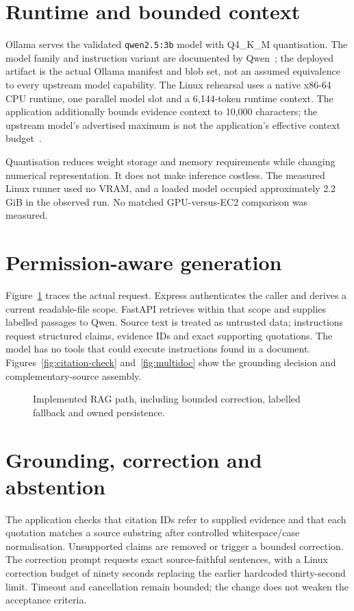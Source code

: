 \documentclass[11pt,a4paper,oneside]{report}
\newcommand{\ShortCaption}[1]{\csname ShortCaption#1\endcsname}
\newcommand{\diagram}[3]{\par\begin{figure}[htbp]\centering\sbox{\DiagramBox}{}\ifdim\wd\DiagramBox>\linewidth\resizebox{\linewidth}{!}{\usebox{\DiagramBox}}\else\usebox{\DiagramBox}\fi\caption[\ShortCaption{#1}]{#2}\label{fig:#3}\end{figure}\par}
\begin{document}
\section{Runtime and bounded context}
Ollama serves the validated \texttt{qwen2.5:3b} model with Q4\_K\_M quantisation. The model family and instruction variant are documented by Qwen~\cite{qwen}; the deployed artifact is the actual Ollama manifest and blob set, not an assumed equivalence to every upstream model capability. The Linux rehearsal uses a native x86-64 CPU runtime, one parallel model slot and a 6,144-token runtime context. The application additionally bounds evidence context to 10,000 characters; the upstream model's advertised maximum is not the application's effective context budget~\cite{ollama}.

Quantisation reduces weight storage and memory requirements while changing numerical representation. It does not make inference costless. The measured Linux runner used no VRAM, and a loaded model occupied approximately 2.2 GiB in the observed run. No matched GPU-versus-EC2 comparison was measured.
\section{Permission-aware generation}
Figure~\ref{fig:rag} traces the actual request. Express authenticates the caller and derives a current readable-file scope. FastAPI retrieves within that scope and supplies labelled passages to Qwen. Source text is treated as untrusted data; instructions request structured claims, evidence IDs and exact supporting quotations. The model has no tools that could execute instructions found in a document.
Figures~\ref{fig:citation-check} and~\ref{fig:multidoc} show the grounding decision and complementary-source assembly.
\diagram{rag}{Implemented RAG path, including bounded correction, labelled fallback and owned persistence.}{rag}
\section{Grounding, correction and abstention}
The application checks that citation IDs refer to supplied evidence and that each quotation matches a source substring after controlled whitespace/case normalisation. Unsupported claims are removed or trigger a bounded correction. The correction prompt requests exact source-faithful sentences, with a Linux correction budget of ninety seconds replacing the earlier hardcoded thirty-second limit. Timeout and cancellation remain bounded; the change does not weaken the acceptance criteria.
\end{document}
